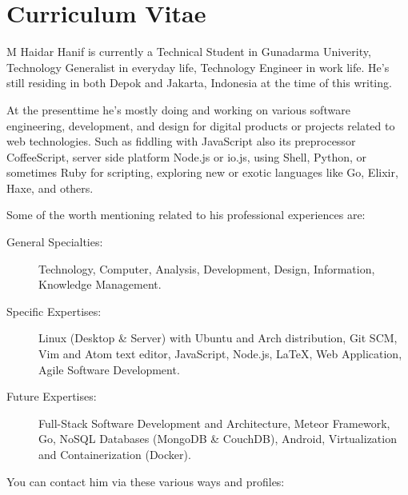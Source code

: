 \cleardoublepage
{}

\thispagestyle{empty}

\chapter*{Curriculum Vitae}
\label{chap:cv}

\begin{figure}[htb]
    \centering
    \label{fig:cv:mhaidarhanif}
\end{figure}

M Haidar Hanif is currently a Technical Student in Gunadarma Univerity, Technology Generalist in everyday life, Technology Engineer in work life.
He's still residing in both Depok and Jakarta, Indonesia at the time of this writing.

At the presenttime he's mostly doing and working on various software engineering, development, and design for digital products or projects related to web technologies.
Such as fiddling with JavaScript also its preprocessor CoffeeScript, server side platform Node.js or io.js, using Shell, Python, or sometimes Ruby for scripting, exploring new or exotic languages like Go, Elixir, Haxe, and others.

\noindent Some of the worth mentioning related to his professional experiences are:

\begin{description}
  \item [General Specialties:] Technology, Computer, Analysis, Development, Design, Information, Knowledge Management.
  \item [Specific Expertises:] Linux (Desktop \& Server) with Ubuntu and Arch distribution, Git SCM, Vim and Atom text editor, JavaScript, Node.js, LaTeX, Web Application, Agile Software Development.
  \item [Future Expertises:] Full-Stack Software Development and Architecture, Meteor Framework, Go, NoSQL Databases (MongoDB \& CouchDB), Android, Virtualization and Containerization (Docker).
\end{description}

\clearpage

\noindent You can contact him via these various ways and profiles:

